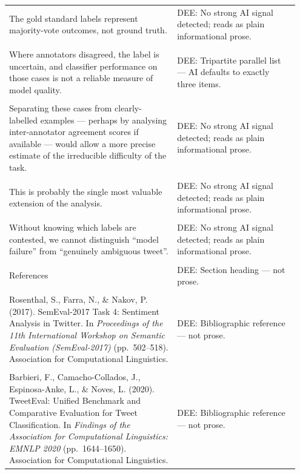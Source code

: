 \documentclass[11pt]{article}
\begin{document}
\begin{longtable}{|p{0.55\linewidth}|p{0.40\linewidth}|}
\hline
\rule{0pt}{3.5cm} & \\
\hline
The gold standard labels represent majority-vote outcomes, not ground truth. & DEE: No strong AI signal detected; reads as plain informational prose. \\[2pt]
\hline
\rule{0pt}{3.5cm} & \\
\hline
Where annotators disagreed, the label is uncertain, and classifier performance on those cases is not a reliable measure of model quality. & DEE: Tripartite parallel list --- AI defaults to exactly three items. \\[2pt]
\hline
\rule{0pt}{3.5cm} & \\
\hline
Separating these cases from clearly-labelled examples --- perhaps by analysing inter-annotator agreement scores if available --- would allow a more precise estimate of the irreducible difficulty of the task. & DEE: No strong AI signal detected; reads as plain informational prose. \\[2pt]
\hline
\rule{0pt}{3.5cm} & \\
\hline
This is probably the single most valuable extension of the analysis. & DEE: No strong AI signal detected; reads as plain informational prose. \\[2pt]
\hline
\rule{0pt}{3.5cm} & \\
\hline
Without knowing which labels are contested, we cannot distinguish ``model failure'' from ``genuinely ambiguous tweet''. & DEE: No strong AI signal detected; reads as plain informational prose. \\[2pt]
\hline
\rule{0pt}{3.5cm} & \\
\hline
References & DEE: Section heading --- not prose. \\[2pt]
\hline
\rule{0pt}{3.5cm} & \\
\hline
Rosenthal, S., Farra, N., \& Nakov, P. (2017). SemEval-2017 Task 4: Sentiment Analysis in Twitter. In \textit{Proceedings of the 11th International Workshop on Semantic Evaluation (SemEval-2017)} (pp.\ 502--518). Association for Computational Linguistics. & DEE: Bibliographic reference --- not prose. \\[2pt]
\hline
\rule{0pt}{3.5cm} & \\
\hline
Barbieri, F., Camacho-Collados, J., Espinosa-Anke, L., \& Noves, L. (2020). TweetEval: Unified Benchmark and Comparative Evaluation for Tweet Classification. In \textit{Findings of the Association for Computational Linguistics: EMNLP 2020} (pp.\ 1644--1650). Association for Computational Linguistics. & DEE: Bibliographic reference --- not prose. \\[2pt]

\end{longtable}
\end{document}
